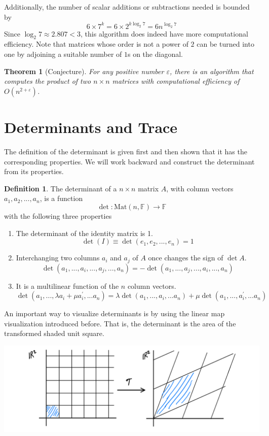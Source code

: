 \documentclass{article}
\newtheorem{theorem}{Theorem}[section]
\theoremstyle{remark}
\theoremstyle{definition}
\newtheorem{definition}{Definition}[section]
\begin{document}
    Additionally, the number of scalar additions or subtractions needed is bounded by 
    \[6 \times 7^k = 6 \times 2^{k \log_2{7}} = 6 n^{\log_2{7}}\]
    Since $\log_2{7} \approx 2.807 < 3$, this algorithm does indeed have more computational efficiency. Note that matrices whose order is not a power of $2$ can be turned into one by adjoining a suitable number of $1$s on the diagonal. 

    \begin{theorem}[Conjecture]
    For any positive number $\varepsilon$, there is an algorithm that computes the product of two $n \times n$ matrices with computational efficiency of $O(n^{2 + \varepsilon})$. 
    \end{theorem}

\section{Determinants and Trace}

  The definition of the determinant is given first and then shown that it has the corresponding properties. We will work backward and construct the determinant from its properties. 

  \begin{definition}
  The determinant of a $n \times n$ matrix $A$, with column vectors $a_1, a_2, ..., a_n$, is a function
  \[\det: \text{Mat}(n, \mathbb{F}) \longrightarrow \mathbb{F}\]
  with the following three properties
  \begin{enumerate}
      \item The determinant of the identity matrix is 1. 
  \[\det{(I)} \equiv \det{(e_1, e_2, ..., e_n)} = 1\]
      \item Interchanging two columns $a_i$ and $a_j$ of $A$ once changes the sign of $\det{A}$. 
  \[\det{(a_1, ..., a_i, ..., a_j, ..., a_n)} = -\det{(a_1, ..., a_j, ..., a_i, ..., a_n)}\]
      \item It is a multilinear function of the $n$ column vectors. 
  \[\det{(a_1, ..., \lambda a_i + \mu a_i^\prime, ... a_n)} = \lambda \det{(a_1, ..., a_i, ... a_n)} + \mu \det{(a_1, ..., a_i^\prime, ... a_n)} \]
  \end{enumerate}
  \end{definition}

  An important way to visualize determinants is by using the linear map visualization introduced before. That is, the determinant is the area of the transformed shaded unit square. 
  \begin{center}
      \includegraphics[scale=0.25]{img/Determinant.PNG}
  \end{center}
\end{document}
